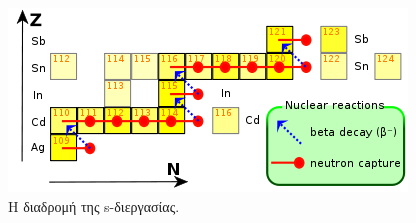 \begin{figure}
    \centering
    \includegraphics[scale=0.7]{Figures/sprocess.png}
    \caption{Η διαδρομή της s-διεργασίας.}
    \label{fig:apx:sprocess_path}
\end{figure}
